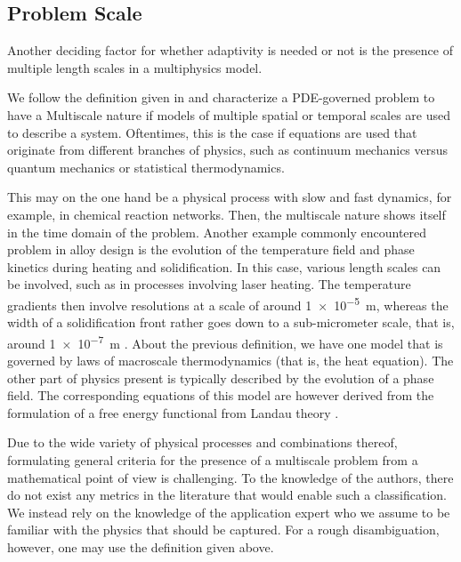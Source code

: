 \documentclass[asi,article,submit,moreauthors]{Definitions/mdpi}
\begin{document}
\subsection{Problem Scale}\label{sec:problem-scale}

Another deciding factor for whether adaptivity is needed or not is the presence of multiple length scales in a multiphysics model.

We follow the definition given in \cite{eMultiscaleModeling2011,ePrinciplesMultiscaleModeling2011} and characterize a PDE-governed problem to have a Multiscale nature if models of multiple spatial or temporal scales are used to describe a system.
Oftentimes, this is the case if equations are used that originate from different branches of physics, such as continuum mechanics versus quantum mechanics or statistical thermodynamics.

This may on the one hand be a physical process with slow and fast dynamics, for example, in chemical reaction networks.
Then, the multiscale nature shows itself in the time domain of the problem.
Another example commonly encountered problem in alloy design is the evolution of the temperature field and phase kinetics during heating and solidification.
In this case, various length scales can be involved, such as in processes involving laser heating.
The temperature gradients then involve resolutions at a scale of around \SI{1e-5}{\metre}, whereas the width of a solidification front rather goes down to a sub-micrometer scale, that is, around \SI{1e-7}{\metre} \cite{zimbrodModellingMicrostructuresInsitu2021}.
About the previous definition, we have one model that is governed by laws of macroscale thermodynamics (that is,  the heat equation).
The other part of physics present is typically described by the evolution of a phase field.
The corresponding equations of this model are however derived from the formulation of a free energy functional from Landau theory \cite{landauTheoryPhaseTransitions1937}.

Due to the wide variety of physical processes and combinations thereof, formulating general criteria for the presence of a multiscale problem from a mathematical point of view is challenging.
To the knowledge of the authors, there do not exist any metrics in the literature that would enable such a classification.
We instead rely on the knowledge of the application expert who we assume to be familiar with the physics that should be captured.
For a rough disambiguation, however, one may use the definition given above.
\end{document}
